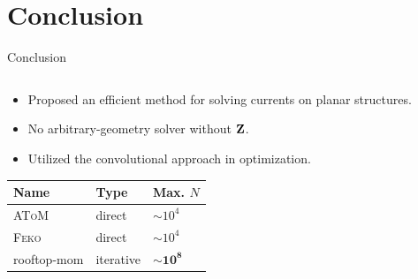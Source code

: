\documentclass[t, aspectratio=169, 10pt]{beamer}
\begin{document}
\section{Conclusion}
\begin{frame}{Conclusion}
    \begin{columns}
        \begin{column}[t]{0.49\textwidth}
            \begin{itemize}[<+->]
                \item Proposed an efficient method for solving currents on planar structures.
                \item No arbitrary-geometry solver without $\mathbf{Z}$.
                \item Utilized the convolutional approach in optimization.
            \end{itemize}
            \begin{table}[ht]
                \centering
                \begin{tabu} to 0.95\textwidth {X[c, 2] X[c, 1] X[c, 1.5]}
                    \toprule
                    Name & Type & Max. $N$ \\ 
                    \midrule
                    \textsc{AToM}\footnotemark[1] & direct & $\sim 10^4$ \\ 
                    \textsc{Feko}\footnotemark[2] & direct & $\sim 10^4$  \\ 
                    rooftop-mom & iterative & {$\sim \bm{10^8}$} \\
                    \bottomrule
               \end{tabu}
            \end{table}
        \end{column}
        \begin{column}[t]{0.49\textwidth}
            \only<3>{
                \begin{figure}
                    \centering
                    \vspace*{-2mm}
                    \begin{tikzcd}[ampersand replacement=\&, row sep=2em, column sep=3em, remember picture,
                                     execute at end picture={%
                        \begin{scope}[on background layer]
                            \node[draw, PairedF, thick, rounded corners, fit=(top1) (top2), inner sep=1pt,

\end{scope}}
\end{tikzcd}
\end{figure}}
\end{column}
\end{columns}
\end{frame}
\end{document}
